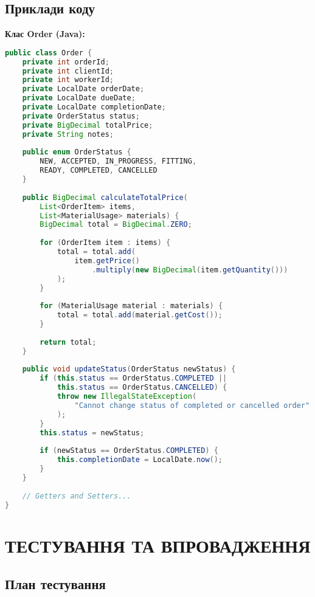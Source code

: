 \documentclass[14pt,a4paper]{extarticle}
\begin{document}
\newpage
\subsection{Приклади коду}

\textbf{Клас Order (Java):}

\begin{lstlisting}[language=Java, caption=Клас Order, basicstyle=\small\ttfamily, breaklines=true]
public class Order {
    private int orderId;
    private int clientId;
    private int workerId;
    private LocalDate orderDate;
    private LocalDate dueDate;
    private LocalDate completionDate;
    private OrderStatus status;
    private BigDecimal totalPrice;
    private String notes;
    
    public enum OrderStatus {
        NEW, ACCEPTED, IN_PROGRESS, FITTING, 
        READY, COMPLETED, CANCELLED
    }
    
    public BigDecimal calculateTotalPrice(
        List<OrderItem> items, 
        List<MaterialUsage> materials) {
        BigDecimal total = BigDecimal.ZERO;
        
        for (OrderItem item : items) {
            total = total.add(
                item.getPrice()
                    .multiply(new BigDecimal(item.getQuantity()))
            );
        }
        
        for (MaterialUsage material : materials) {
            total = total.add(material.getCost());
        }
        
        return total;
    }
    
    public void updateStatus(OrderStatus newStatus) {
        if (this.status == OrderStatus.COMPLETED || 
            this.status == OrderStatus.CANCELLED) {
            throw new IllegalStateException(
                "Cannot change status of completed or cancelled order"
            );
        }
        this.status = newStatus;
        
        if (newStatus == OrderStatus.COMPLETED) {
            this.completionDate = LocalDate.now();
        }
    }
    
    // Getters and Setters...
}
\end{lstlisting}

\newpage
\section{ТЕСТУВАННЯ ТА ВПРОВАДЖЕННЯ}

\subsection{План тестування}
\end{document}
